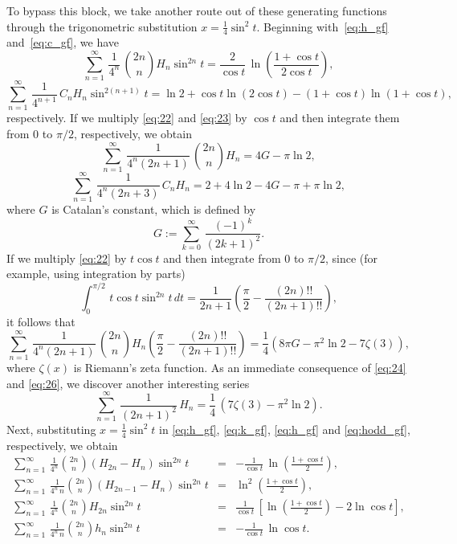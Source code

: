 \documentclass[12pt,reqno]{article}
\begin{document}
To bypass this block, we take another route out of these generating functions through the trigonometric substitution $x = \frac{1}{4}\sin^2t$. Beginning with~\eqref{eq:h_gf} and~\eqref{eq:c_gf}, we have
\begin{equation}
\sum_{n=1}^\infty\,\frac{1}{4^n}\,\binom{2n}{n}H_n\sin^{2n}t = \frac{2}{\cos t}\,\ln\left(\frac{1 + \cos t}{2\cos t}\right),
\label{eq:22}
\end{equation}
\begin{equation}
\sum_{n=1}^\infty\,\frac{1}{4^{n+1}}\,C_{n}H_n\sin^{2(n+1)}t =\ln 2 + \cos t\ln(2\cos t) - (1 + \cos t)\ln(1 + \cos t),
\label{eq:23}
\end{equation}
respectively. If we multiply \eqref{eq:22} and \eqref{eq:23} by $\cos t$ and then integrate them from $0$ to $\pi/2$, respectively, we obtain
\begin{equation}
\sum_{n=1}^\infty\,\frac{1}{4^n(2n+1)}\,\binom{2n}{n}H_n = 4G - \pi\ln 2,
\label{eq:24}
\end{equation}
\begin{equation}
\sum_{n=1}^\infty\,\frac{1}{4^n(2n+3)}\,C_{n}H_n = 2 + 4\ln 2 - 4G -\pi + \pi\ln2,
\end{equation}
where $G$ is Catalan's constant, which is defined by
$$G := \sum_{k=0}^\infty\,\frac{(-1)^k}{(2k+1)^2}.$$
If we multiply \eqref{eq:22} by $t\cos t$ and then integrate from $0$ to $\pi/2$, since (for example, using integration by parts)
$$\int_0^{\pi/2}\,t\cos t\sin^{2n}t\,dt = \frac{1}{2n+1}\left(\frac{\pi}{2} - \frac{(2n)!!}{(2n+1)!!}\right),$$
it follows that
\begin{equation}
\sum_{n=1}^\infty\,\frac{1}{4^n(2n+1)}\,\binom{2n}{n}H_n\left(\frac{\pi}{2} - \frac{(2n)!!}{(2n+1)!!}\right) =\frac{1}{4}(8\pi G - \pi^2\ln 2 - 7\zeta(3)),
\label{eq:26}
\end{equation}
where $\zeta(x)$ is Riemann's zeta function. As an immediate consequence of 
\eqref{eq:24} and \eqref{eq:26}, we discover another interesting series
\begin{equation}
\sum_{n=1}^\infty\,\frac{1}{(2n+1)^2}\,H_n = \frac{1}{4}\,(7\zeta(3) -\pi^2\ln 2). 
\end{equation}
Next, substituting $x = \frac{1}{4}\sin^2t$ in \eqref{eq:h_gf}, \eqref{eq:k_gf}, \eqref{eq:h_gf} and \eqref{eq:hodd_gf}, respectively, we obtain
\begin{eqnarray}
\sum_{n=1}^\infty\,\frac{1}{4^n}\binom{2n}{n}(H_{2n} - H_n)\sin^{2n}t & = & - \frac{1}{\cos t}\,\ln\left(\frac{1 + \cos t}{2}\right), \label{eq:28}\\
\sum_{n=1}^\infty\,\frac{1}{4^n\,n}\binom{2n}{n}(H_{2n-1} - H_n)\sin^{2n}t & = & \ln^2\left(\frac{1 + \cos t}{2}\right),\label{eq:29}\\
\sum_{n=1}^\infty\,\frac{1}{4^n}\binom{2n}{n}H_{2n}\sin^{2n}t & = & \frac{1}{\cos t}\,\left[\ln\left(\frac{1 + \cos t}{2}\right) -2\ln\cos t\right],\label{eq:30}\\
\sum_{n=1}^\infty\,\frac{1}{4^n\,n}\binom{2n}{n}h_{n}\sin^{2n}t & = & - \frac{1}{\cos t}\,\ln\cos t. \label{eq:31}
\end{eqnarray}
\end{document}
